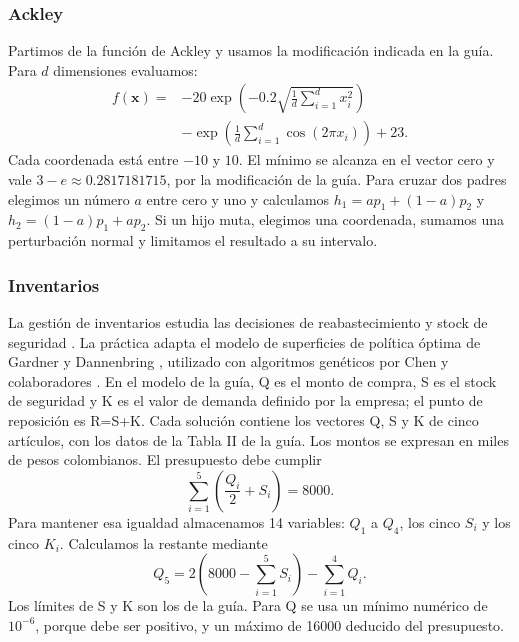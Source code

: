 \documentclass[conference]{IEEEtran}
\begin{document}
\subsubsection{Ackley}
Partimos de la función de Ackley \cite{ref5} y usamos la modificación indicada en la guía. Para $d$ dimensiones evaluamos:
\begin{equation}
\begin{split}
f(\mathbf{x})={}&-20\exp\left(-0.2\sqrt{\frac{1}{d}\sum_{i=1}^{d}x_i^2}\right)\\
&-\exp\left(\frac{1}{d}\sum_{i=1}^{d}\cos(2\pi x_i)\right)+23.
\end{split}
\end{equation}
Cada coordenada está entre $-10$ y $10$. El mínimo se alcanza en el vector cero y vale $3-e\approx0.2817181715$, por la modificación de la guía. Para cruzar dos padres elegimos un número $a$ entre cero y uno y calculamos $h_1=a p_1+(1-a)p_2$ y $h_2=(1-a)p_1+a p_2$. Si un hijo muta, elegimos una coordenada, sumamos una perturbación normal y limitamos el resultado a su intervalo.

\subsubsection{Inventarios}
La gestión de inventarios estudia las decisiones de reabastecimiento y stock de seguridad \cite{ref6}. La práctica adapta el modelo de superficies de política óptima de Gardner y Dannenbring \cite{ref9}, utilizado con algoritmos genéticos por Chen y colaboradores \cite{ref10}. En el modelo de la guía, Q es el monto de compra, S es el stock de seguridad y K es el valor de demanda definido por la empresa; el punto de reposición es R=S+K. Cada solución contiene los vectores Q, S y K de cinco artículos, con los datos de la Tabla II de la guía. Los montos se expresan en miles de pesos colombianos. El presupuesto debe cumplir
\begin{equation}
\sum_{i=1}^{5}\left(\frac{Q_i}{2}+S_i\right)=8000.
\end{equation}
Para mantener esa igualdad almacenamos 14 variables: $Q_1$ a $Q_4$, los cinco $S_i$ y los cinco $K_i$. Calculamos la restante mediante
\begin{equation}
Q_5=2\left(8000-\sum_{i=1}^{5}S_i\right)-\sum_{i=1}^{4}Q_i.
\end{equation}
Los límites de S y K son los de la guía. Para Q se usa un mínimo numérico de $10^{-6}$, porque debe ser positivo, y un máximo de 16000 deducido del presupuesto.
\end{document}
